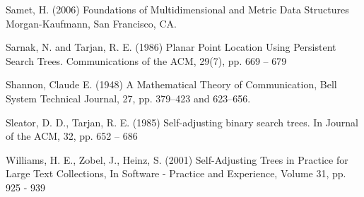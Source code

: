 \documentclass[mcs]{scsthesis}
\begin{document}
\begin{thebibliography}{5}
Samet, H. (2006) Foundations of Multidimensional and Metric Data Structures
Morgan-Kaufmann, San Francisco, CA.

Sarnak, N. and Tarjan, R. E. (1986) Planar Point Location Using Persistent
Search Trees. Communications of the ACM, 29(7), pp. 669 -- 679

Shannon, Claude E. (1948) A Mathematical Theory of Communication,
Bell System Technical Journal, 27, pp. 379--423 and 623--656.

Sleator, D. D., Tarjan, R. E. (1985) Self-adjusting binary search trees.
In Journal of the ACM, 32, pp. 652 – 686

Williams, H. E., Zobel, J., Heinz, S. (2001) Self-Adjusting Trees in Practice
for Large Text Collections, In Software - Practice and Experience,
Volume 31, pp. 925 - 939

\end{thebibliography}
\end{document}
